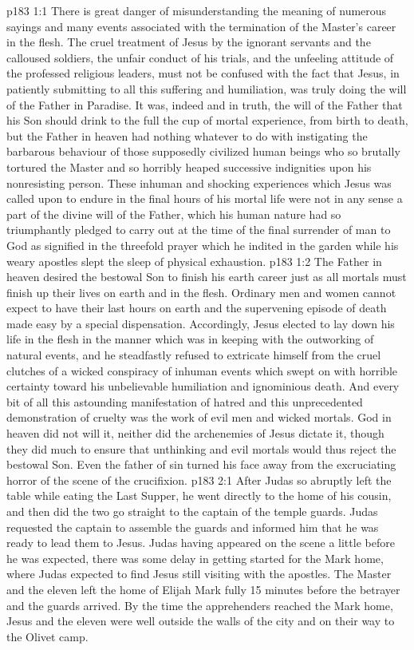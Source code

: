 \vs p183 1:1 There is great danger of misunderstanding the meaning of numerous sayings and many events associated with the termination of the Master’s career in the flesh. The cruel treatment of Jesus by the ignorant servants and the calloused soldiers, the unfair conduct of his trials, and the unfeeling attitude of the professed religious leaders, must not be confused with the fact that Jesus, in patiently submitting to all this suffering and humiliation, was truly doing the will of the Father in Paradise. It was, indeed and in truth, the will of the Father that his Son should drink to the full the cup of mortal experience, from birth to death, but the Father in heaven had nothing whatever to do with instigating the barbarous behaviour of those supposedly civilized human beings who so brutally tortured the Master and so horribly heaped successive indignities upon his nonresisting person. These inhuman and shocking experiences which Jesus was called upon to endure in the final hours of his mortal life were not in any sense a part of the divine will of the Father, which his human nature had so triumphantly pledged to carry out at the time of the final surrender of man to God as signified in the threefold prayer which he indited in the garden while his weary apostles slept the sleep of physical exhaustion.
\vs p183 1:2 The Father in heaven desired the bestowal Son to finish his earth career  just as all mortals must finish up their lives on earth and in the flesh. Ordinary men and women cannot expect to have their last hours on earth and the supervening episode of death made easy by a special dispensation. Accordingly, Jesus elected to lay down his life in the flesh in the manner which was in keeping with the outworking of natural events, and he steadfastly refused to extricate himself from the cruel clutches of a wicked conspiracy of inhuman events which swept on with horrible certainty toward his unbelievable humiliation and ignominious death. And every bit of all this astounding manifestation of hatred and this unprecedented demonstration of cruelty was the work of evil men and wicked mortals. God in heaven did not will it, neither did the archenemies of Jesus dictate it, though they did much to ensure that unthinking and evil mortals would thus reject the bestowal Son. Even the father of sin turned his face away from the excruciating horror of the scene of the crucifixion.
\vs p183 2:1 After Judas so abruptly left the table while eating the Last Supper, he went directly to the home of his cousin, and then did the two go straight to the captain of the temple guards. Judas requested the captain to assemble the guards and informed him that he was ready to lead them to Jesus. Judas having appeared on the scene a little before he was expected, there was some delay in getting started for the Mark home, where Judas expected to find Jesus still visiting with the apostles. The Master and the eleven left the home of Elijah Mark fully 15 minutes before the betrayer and the guards arrived. By the time the apprehenders reached the Mark home, Jesus and the eleven were well outside the walls of the city and on their way to the Olivet camp.
